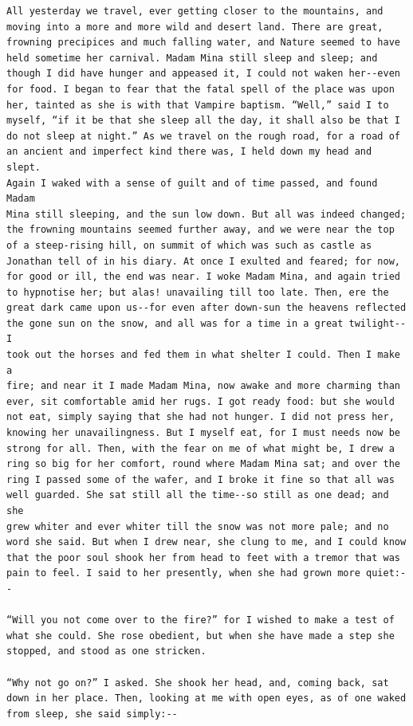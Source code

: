 \documentclass{article}
\begin{document}
\begin{verbatim}
All yesterday we travel, ever getting closer to the mountains, and
moving into a more and more wild and desert land. There are great,
frowning precipices and much falling water, and Nature seemed to have
held sometime her carnival. Madam Mina still sleep and sleep; and
though I did have hunger and appeased it, I could not waken her--even
for food. I began to fear that the fatal spell of the place was upon
her, tainted as she is with that Vampire baptism. “Well,” said I to
myself, “if it be that she sleep all the day, it shall also be that I
do not sleep at night.” As we travel on the rough road, for a road of
an ancient and imperfect kind there was, I held down my head and slept.
Again I waked with a sense of guilt and of time passed, and found Madam
Mina still sleeping, and the sun low down. But all was indeed changed;
the frowning mountains seemed further away, and we were near the top
of a steep-rising hill, on summit of which was such as castle as
Jonathan tell of in his diary. At once I exulted and feared; for now,
for good or ill, the end was near. I woke Madam Mina, and again tried
to hypnotise her; but alas! unavailing till too late. Then, ere the
great dark came upon us--for even after down-sun the heavens reflected
the gone sun on the snow, and all was for a time in a great twilight--I
took out the horses and fed them in what shelter I could. Then I make a
fire; and near it I made Madam Mina, now awake and more charming than
ever, sit comfortable amid her rugs. I got ready food: but she would
not eat, simply saying that she had not hunger. I did not press her,
knowing her unavailingness. But I myself eat, for I must needs now be
strong for all. Then, with the fear on me of what might be, I drew a
ring so big for her comfort, round where Madam Mina sat; and over the
ring I passed some of the wafer, and I broke it fine so that all was
well guarded. She sat still all the time--so still as one dead; and she
grew whiter and ever whiter till the snow was not more pale; and no
word she said. But when I drew near, she clung to me, and I could know
that the poor soul shook her from head to feet with a tremor that was
pain to feel. I said to her presently, when she had grown more quiet:--

“Will you not come over to the fire?” for I wished to make a test of
what she could. She rose obedient, but when she have made a step she
stopped, and stood as one stricken.

“Why not go on?” I asked. She shook her head, and, coming back, sat
down in her place. Then, looking at me with open eyes, as of one waked
from sleep, she said simply:--


\end{verbatim}
\end{document}
